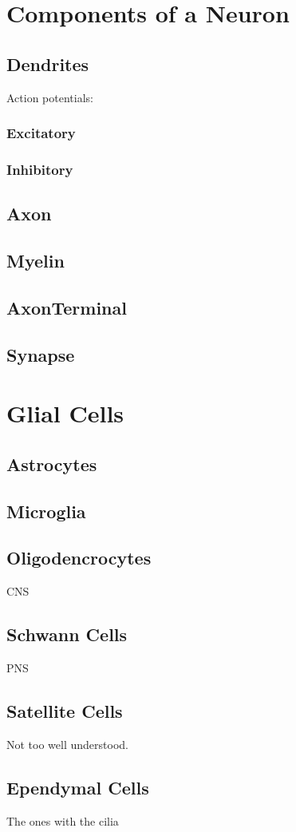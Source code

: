 \documentclass[letterpaper,12pt]{article}
\begin{document}
\section{Components of a Neuron}

\subsection{Dendrites}

Action potentials:

\subsubsection{Excitatory}
\subsubsection{Inhibitory}

\subsection{Axon}
\subsection{Myelin}
\subsection{AxonTerminal}
\subsection{Synapse}

\section{Glial Cells}

\subsection{Astrocytes}

\subsection{Microglia}

\subsection{Oligodencrocytes}

CNS

\subsection{Schwann Cells}

PNS

\subsection{Satellite Cells}

Not too well understood.

\subsection{Ependymal Cells}

The ones with the cilia
\end{document}
